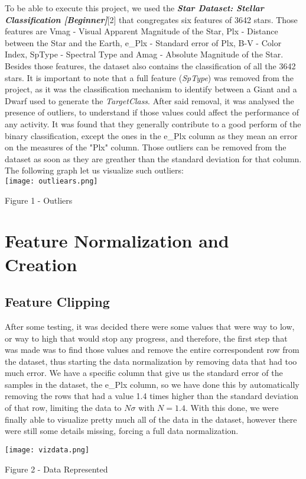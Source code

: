 \documentclass[conference]{IEEEtran}
\begin{document}
To be able to execute this project, we used the 
\textbf{\textit{Star Dataset: Stellar Classification [Beginner]}}[2] that congregates six features of 3642 stars. Those features are Vmag - Visual Apparent Magnitude of the Star, Plx - Distance between the Star and the Earth, e\_Plx - Standard error of Plx, B-V - Color Index, SpType - Spectral Type and Amag - Absolute Magnitude of the Star. Besides those features, the dataset also contains the classification of all the 3642 stars. It is important to note that a full feature (\textit{SpType}) was removed from the project, as it was the classification mechanism to identify between a Giant and a Dwarf used to generate the \textit{TargetClass}. After said removal, it was analysed the presence of outliers, to understand if those values could affect the performance of any activity. It was found that they generally contribute to a good perform of the binary classification, except the ones in the e\_Plx column as they mean an error on the measures of the "Plx" column. Those outliers can be removed from the dataset as soon as they are greather than the standard deviation for that column. The following graph let us visualize such outliers: \\

\texttt{[image: outliears.png]}
\caption{Figure 1 - Outliers}

\par


\section{Feature Normalization and Creation}
\subsection{Feature Clipping}
After some testing, it was decided there were some values that were way to low, or way to high that would stop any progress, and therefore, the first step that was made was to find those values and remove the entire correspondent row from the dataset, thus starting the data normalization by removing data that had too much error. We have a specific column that give us the standard error of the samples in the dataset, the e\_Plx column, so we have done this by automatically removing the rows that had a value 1.4 times higher than the standard deviation of that row, limiting the data to $N\sigma$ with $N = 1.4$. With this done, we were finally able to visualize pretty much all of the data in the dataset, however there were still some details missing, forcing a full data normalization. 
\par
\texttt{[image: vizdata.png]} 
\caption{Figure 2 - Data Represented}
\par
\end{document}
